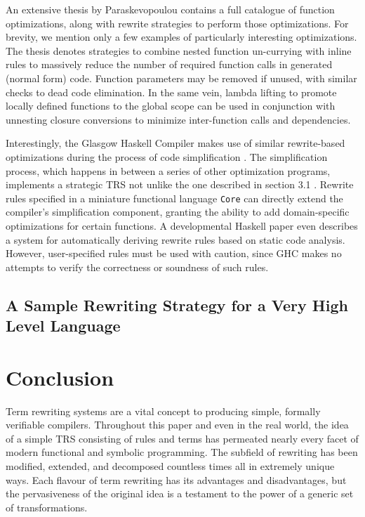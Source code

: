 \documentclass{article}
\begin{document}
An extensive thesis by Paraskevopoulou \cite{paraskevopoulou2020verified} contains a full catalogue of function optimizations,
along with rewrite strategies to perform those optimizations.
For brevity, we mention only a few examples of particularly interesting optimizations.
The thesis denotes strategies to combine nested function un-currying with inline rules
to massively reduce the number of required function calls in generated (normal form) code.
Function parameters may be removed if unused, with similar checks to dead code elimination.
In the same vein, lambda lifting to promote locally defined functions to the global scope can be used in conjunction with unnesting closure conversions
to minimize inter-function calls and dependencies.

Interestingly, the Glasgow Haskell Compiler makes use of similar rewrite-based optimizations during the process of code simplification \cite{brown2011architecture}.
The simplification process, which happens in between a series of other optimization programs, implements a strategic TRS not unlike the one described in section 3.1 .
Rewrite rules specified in a miniature functional language \texttt{Core} can directly extend the compiler's simplification component,
granting the ability to add domain-specific optimizations for certain functions.
A developmental Haskell paper \cite{peytonjones2001playing} even describes a system for automatically deriving rewrite rules based on static code analysis.
However, user-specified rules must be used with caution,
since GHC makes no attempts to verify the correctness or soundness of such rules.

\subsection{A Sample Rewriting Strategy for a Very High Level Language}
\section{Conclusion}

Term rewriting systems are a vital concept to producing simple, formally verifiable compilers.
Throughout this paper and even in the real world, the idea of a simple TRS consisting of rules and terms
has permeated nearly every facet of modern functional and symbolic programming. The subfield of rewriting has been modified, extended, and decomposed
countless times all in extremely unique ways. Each flavour of term rewriting has its advantages and disadvantages, but the pervasiveness of the original idea
is a testament to the power of a generic set of transformations.
\end{document}
